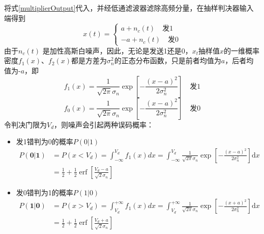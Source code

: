 \documentclass[bwprint]{gmcmthesis}
\numberwithin{equation}{section}
\begin{document}
将式\ref{multiplierOutput}代入，并经低通滤波器滤除高频分量，在抽样判决器输入端得到
\begin{equation}
x(t)=\left\{\begin{array}{c}{a+n_{c}(t)}\quad \mbox{发1} \\ {-a+n_{c}(t)}\quad \mbox{发0}\end{array}\right.
\end{equation}
由于$n_{c}(t)$ 是加性高斯白噪声，因此，无论是发送1还是0，$x_{t}$抽样值$x$的一维概率密度$f_{1}(x)$、$f_{2}(x)$都是方差为$ \sigma_{n}^{2}$的正态分布函数，只是前者均值为$a$，后者均值为-$a$，即
\begin{equation}
f_{1}(x)=\frac{1}{\sqrt{2 \pi} \sigma_{n}} \exp \left[-\frac{(x-a)^{2}}{2 \sigma_{n}^{2}}\right]
\quad\mbox{发1}\end{equation}
\begin{equation}
f_{0}(x)=\frac{1}{\sqrt{2 \pi} \sigma_{n}} \exp \left[-\frac{(x-a)^{2}}{2 \sigma_{n}^{2}}\right]
\quad\mbox{发0}\end{equation}
令判决门限为$V_{d}$，则噪声会引起两种误码概率：

\begin{itemize}

\item 发1错判为0的概率$P(0|1)$
\begin{equation}
\begin{aligned}
P(\mathbf{0} | \mathbf{1})&=P\left(x<V_{d}\right)=\int_{-\infty}^{V_{d}} f_{1}(x) d x=\int_{-\infty}^{V_{d}} \frac{1}{\sqrt{2 \pi} \sigma_{n}} \exp \left[-\frac{(x-a)^{2}}{2 \sigma_{n}^{2}}\right] \mathrm{d} x \\
& = \frac{1}{2}+\frac{1}{2} \operatorname{erf}\left[\frac{V_{d}-a}{\sqrt{2} \sigma_{n}}\right]
\end{aligned}
\end{equation} 

\item 发0错判为1的概率$P(1|0)$
\begin{equation}
\begin{aligned}
P(\mathbf{1} | \mathbf{0})&=P\left(x>V_{d}\right)=\int_{V_{d}}^{+\infty} f_{1}(x) d x=\int_{V_{d}}^{+\infty} \frac{1}{\sqrt{2 \pi} \sigma_{n}} \exp \left[-\frac{(x+a)^{2}}{2 \sigma_{n}^{2}}\right] \mathrm{d} x \\ &=\frac{1}{2}+\frac{1}{2} \operatorname{erf}\left[\frac{V_{d}+a}{\sqrt{2} \sigma_{n}}\right]
\end{aligned}
\end{equation} 
	
\end{itemize}
\end{document}
